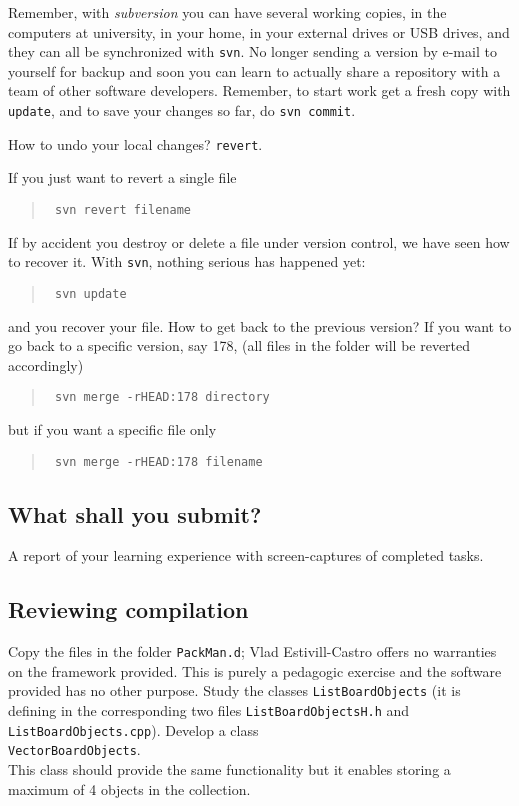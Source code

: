 \documentclass[article,12pt]{article}
\begin{document}
Remember, with {\em subversion} you can have several working copies,
in the computers at university, in your home, in your external drives
or USB drives, and they can all be synchronized with {\tt svn}.
No longer sending a version by e-mail to yourself for backup
and soon you can learn to actually share a repository with a team
of other software developers. Remember, to start work
get a fresh copy with {\tt update}, and to save your changes
so far, do {\tt svn commit}.

How to undo your local changes? {\tt revert}.

If you just want to revert a single file
\begin{quote}
{\tt
svn revert filename
}
\end{quote}
If by accident you destroy or delete a file under version control,
we have seen how to recover it.
With
{\tt svn}, nothing serious has happened yet:
\begin{quote}
{\tt
svn update
}
\end{quote}
and you recover your file.
How to get back to the previous version?
If you want to go back to a specific version, say 178,
(all files in the folder will be reverted accordingly)
\begin{quote}
{\tt
svn merge -rHEAD:178 directory
}
\end{quote}
but if you want a specific file only
\begin{quote}
{\tt
svn merge -rHEAD:178 filename
}
\end{quote}
\subsection*{What shall you submit?}
A report of your learning experience with screen-captures
of completed tasks.

\subsection*{Reviewing compilation}
Copy the files in the folder
{\tt PackMan.d};
Vlad Estivill-Castro offers no warranties on the framework provided.
This is purely a pedagogic exercise and the software provided has no other purpose.
Study the classes  {\tt ListBoardObjects} (it is defining in the corresponding two files
{\tt ListBoardObjectsH.h} and {\tt ListBoardObjects.cpp}).
Develop a class \\
{\tt VectorBoardObjects}.\\
This class should provide the same functionality but it enables storing
a maximum of 4 objects in the collection.
\end{document}
